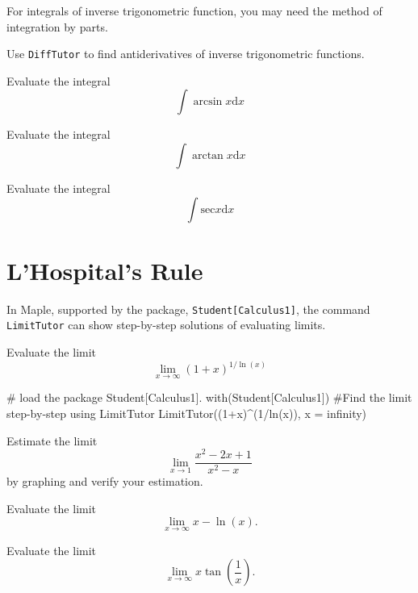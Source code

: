 \documentclass[en,11pt,simple]{elegantbook}
\let\BeginKnitrBlock\begin \let\EndKnitrBlock\end
\begin{document}
For integrals of inverse trigonometric function, you may need the method of integration by parts.

Use \texttt{DiffTutor} to find antiderivatives of inverse trigonometric functions.

\BeginKnitrBlock{exercise}{}{}
\protect\hypertarget{exr:unnamed-chunk-192}{}{\label{exr:unnamed-chunk-192} }
Evaluate the integral
\[
\int \arcsin x \mathrm{d} x
\]
\EndKnitrBlock{exercise}

\BeginKnitrBlock{exercise}{}{}
\protect\hypertarget{exr:unnamed-chunk-193}{}{\label{exr:unnamed-chunk-193} }
Evaluate the integral
\[
\int \arctan x \mathrm{d} x
\]
\EndKnitrBlock{exercise}

\BeginKnitrBlock{exercise}{}{}
\protect\hypertarget{exr:unnamed-chunk-194}{}{\label{exr:unnamed-chunk-194} }
Evaluate the integral
\[
\int \mathrm{sec} x \mathrm{d} x
\]
\EndKnitrBlock{exercise}

\hypertarget{lhospitals-rule}{%
\section{L'Hospital's Rule}\label{lhospitals-rule}}

In Maple, supported by the package, \texttt{Student{[}Calculus1{]}}, the command \texttt{LimitTutor} can show step-by-step solutions of evaluating limits.

\BeginKnitrBlock{example}{}{}
\protect\hypertarget{exm:unnamed-chunk-195}{}{\label{exm:unnamed-chunk-195} }
Evaluate the limit
\[
\lim\limits_{x\to \infty}(1+x)^{1/\ln(x)}
\]
\EndKnitrBlock{example}

\BeginKnitrBlock{solution}{}{}
{}
\# load the package Student{[}Calculus1{]}.
with(Student{[}Calculus1{]})
\#Find the limit step-by-step using LimitTutor
LimitTutor((1+x)\^{}(1/ln(x)), x = infinity)
\EndKnitrBlock{solution}

\BeginKnitrBlock{exercise}{}{}
\protect\hypertarget{exr:unnamed-chunk-197}{}{\label{exr:unnamed-chunk-197} }
Estimate the limit
\[
\lim\limits_{x\to 1}\frac{x^2-2x+1}{x^2-x}
\]
by graphing and verify your estimation.
\EndKnitrBlock{exercise}

\BeginKnitrBlock{exercise}{}{}
\protect\hypertarget{exr:unnamed-chunk-198}{}{\label{exr:unnamed-chunk-198} }
Evaluate the limit
\[
\lim\limits_{x\to \infty} x-\ln(x).
\]
\EndKnitrBlock{exercise}

\BeginKnitrBlock{exercise}{}{}
\protect\hypertarget{exr:unnamed-chunk-199}{}{\label{exr:unnamed-chunk-199} }
Evaluate the limit
\[
\lim\limits_{x\to \infty} x\tan(\frac1x).
\]
\EndKnitrBlock{exercise}
\end{document}
